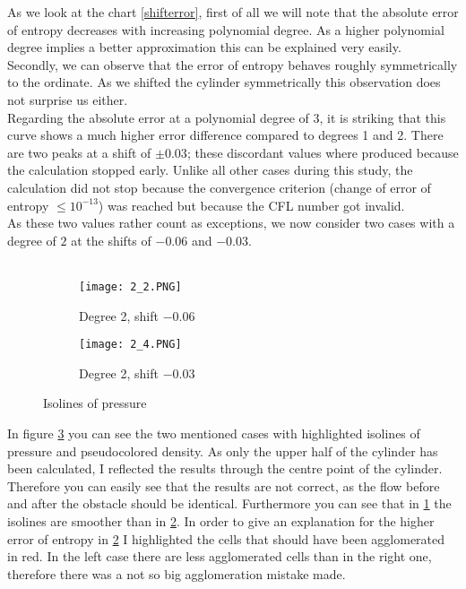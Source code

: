	As we look at the chart \ref{shifterror}, first of all we will note that the absolute error of entropy decreases with increasing polynomial degree. As a higher polynomial degree implies a better approximation this can be explained very easily. \\ \indent
	Secondly, we can observe that the error of entropy behaves roughly symmetrically to the ordinate. As we shifted the cylinder symmetrically this observation does not surprise us either. \\ \indent
	Regarding the absolute error at a polynomial degree of 3, it is striking that this curve shows a much higher error difference compared to degrees 1 and 2. There are two peaks at a shift of $\pm 0.03$; these discordant values where produced because the calculation stopped early. Unlike all other cases during this study, the calculation did not stop because the convergence criterion (change of error of entropy $\leq 10^{-13}$) was reached but because the CFL number got invalid.\\ \indent
	As these two values rather count as exceptions, we now consider two cases with a degree of $2$ at the shifts of $-0.06$ and $-0.03$. \\\\
	
	\begin{figure}[htp]
		\centering
		\begin{subfigure}[b]{0.5\textwidth}
			\centering
			\texttt{[image: 2\_2.PNG]}
			\caption{Degree 2, shift $-0.06$}
			\label{fig:2_2}
		\end{subfigure}%
		\begin{subfigure}[b]{0.5\textwidth}
			\centering
			\texttt{[image: 2\_4.PNG]}
			\caption{Degree 2, shift $-0.03$}
			\label{fig:2_4}
		\end{subfigure}
		\caption{Isolines of pressure}\label{fig:isoshift}
	\end{figure}
	
	In figure \ref{fig:isoshift} you can see the two mentioned cases with highlighted isolines of pressure and pseudocolored density. As only the upper half of the cylinder has been calculated, I reflected the results through the centre point of the cylinder. Therefore you can easily see that the results are not correct, as the flow before and after the obstacle should be identical. Furthermore you can see that in \ref{fig:2_2} the isolines are smoother than in \ref{fig:2_4}. In order to give an explanation for the higher error of entropy in \ref{fig:2_4} I highlighted the cells that should have been agglomerated in red. In the left case there are less agglomerated cells than in the right one, therefore there was a not so big agglomeration mistake made.\\\\
	
